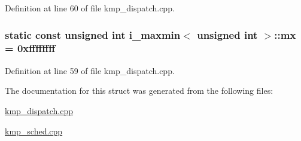 Definition at line 60 of file kmp\-\_\-dispatch.\-cpp.

\hypertarget{structi__maxmin_3_01unsigned_01int_01_4_a0c4673841eea0b582b09f506e4d29105}{
\subsubsection[{mx}]{\setlength{\rightskip}{0pt plus 5cm}static const unsigned {\bf int} {\bf i\-\_\-maxmin}$<$ unsigned {\bf int} $>$\-::mx = 0xffffffff\hspace{0.3cm}{\ttfamily [static]}}}\label{structi__maxmin_3_01unsigned_01int_01_4_a0c4673841eea0b582b09f506e4d29105}


Definition at line 59 of file kmp\-\_\-dispatch.\-cpp.



The documentation for this struct was generated from the following files\-:\begin{DoxyCompactItemize}
\item 
\hyperlink{kmp__dispatch_8cpp}{kmp\-\_\-dispatch.\-cpp}\item 
\hyperlink{kmp__sched_8cpp}{kmp\-\_\-sched.\-cpp}\end{DoxyCompactItemize}
